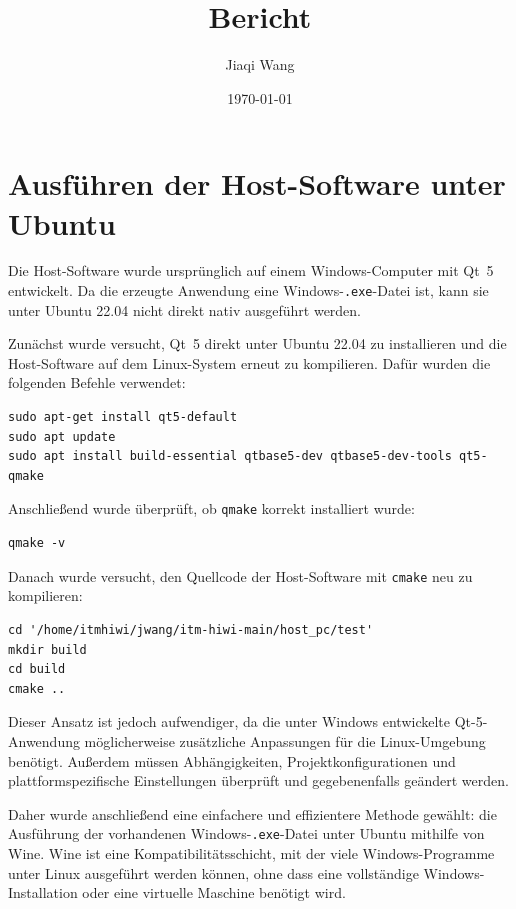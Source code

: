 \documentclass[a4paper,12pt]{article}
\title{Bericht}
\author{Jiaqi Wang}
\date{\today}
\begin{document}
\maketitle

\section{Ausführen der Host-Software unter Ubuntu}

Die Host-Software wurde ursprünglich auf einem Windows-Computer mit Qt~5
entwickelt. Da die erzeugte Anwendung eine Windows-\texttt{.exe}-Datei ist,
kann sie unter Ubuntu 22.04 nicht direkt nativ ausgeführt werden.

Zunächst wurde versucht, Qt~5 direkt unter Ubuntu 22.04 zu installieren und
die Host-Software auf dem Linux-System erneut zu kompilieren. Dafür wurden
die folgenden Befehle verwendet:

\begin{verbatim}
sudo apt-get install qt5-default
sudo apt update
sudo apt install build-essential qtbase5-dev qtbase5-dev-tools qt5-qmake
\end{verbatim}

Anschließend wurde überprüft, ob \texttt{qmake} korrekt installiert wurde:

\begin{verbatim}
qmake -v
\end{verbatim}

Danach wurde versucht, den Quellcode der Host-Software mit \texttt{cmake}
neu zu kompilieren:

\begin{verbatim}
cd '/home/itmhiwi/jwang/itm-hiwi-main/host_pc/test'
mkdir build
cd build
cmake ..
\end{verbatim}

Dieser Ansatz ist jedoch aufwendiger, da die unter Windows entwickelte
Qt-5-Anwendung möglicherweise zusätzliche Anpassungen für die
Linux-Umgebung benötigt. Außerdem müssen Abhängigkeiten,
Projektkonfigurationen und plattformspezifische Einstellungen überprüft
und gegebenenfalls geändert werden.

Daher wurde anschließend eine einfachere und effizientere Methode gewählt:
die Ausführung der vorhandenen Windows-\texttt{.exe}-Datei unter Ubuntu
mithilfe von Wine. Wine ist eine Kompatibilitätsschicht, mit der viele
Windows-Programme unter Linux ausgeführt werden können, ohne dass eine
vollständige Windows-Installation oder eine virtuelle Maschine benötigt
wird.
\end{document}
